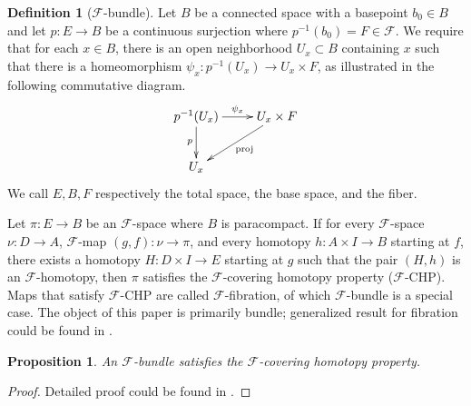 \documentclass[psamsfonts]{amsart}
\newtheorem{prop}[thm]{Proposition}
\theoremstyle{definition}
\newtheorem{defn}[thm]{Definition}
\theoremstyle{remark}
\numberwithin{equation}{section}
\begin{document}
\begin{defn}[$\mathcal{F}$-bundle]
Let $B$ be a connected space with a basepoint $b_{0} \in B$ and let $p: E \rightarrow B$ be a continuous surjection where $p^{-1}(b_{0}) = F \in \mathcal{F}$. We require that for each $x \in B$, there is an open neighborhood $U_{x} \subset B$ containing $x$ such that there is a homeomorphism $\psi_{x}: p^{-1}(U_{x}) \rightarrow U_{x} \times F$, as illustrated in the following commutative diagram. 
\[\xymatrix{
p^{-1}(U_{x}) \ar[r]^-{\psi_{x}} \ar[d]_{p} & U_{x} \times F \ar[dl]^{\text{proj}} \\
U_{x}\\} \]
We call $E, B, F$ respectively the total space, the base space, and the fiber.
\end{defn}

Let $\pi: E \to B$ be an $\mathcal{F}$-space where $B$ is paracompact. If for every $\mathcal{F}$-space $\nu: D \to A$, $\mathcal{F}$-map $(g,f) : \nu \to \pi$, and every homotopy $h : A \times I \to B$ starting at $f$, there exists a homotopy $H : D \times I \to E$ starting at $g$ such that the pair $(H, h)$ is an $\mathcal{F}$-homotopy, then $\pi$ satisfies the $\mathcal{F}$-covering homotopy property ($\mathcal{F}$-CHP). Maps that satisfy $\mathcal{F}$-CHP are called $\mathcal{F}$-fibration, of which $\mathcal{F}$-bundle is a special case. The object of this paper is primarily bundle; generalized result for fibration could be found in \cite[Chapter 5 - 11]{Classifying}.

\begin{prop}
\label{prop:CHP}
An $\mathcal{F}$-bundle satisfies the $\mathcal{F}$-covering homotopy property.
\end{prop}
\begin{proof}
Detailed proof could be found in \cite[Theorem 11.7]{Steenrod}.	
\end{proof}
\end{document}
